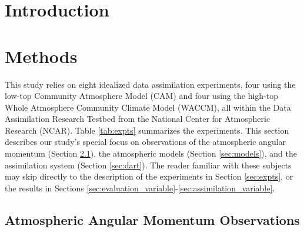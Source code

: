\documentclass[draft,jgrga]{agutex}
\begin{document}
\begin{article}

%
%
\newcommand{\degree}{\ensuremath{^\circ}}
\newcommand{\WACCMNODA}{E1}
\newcommand{\WACCMTROPICS}{E2}
\newcommand{\WACCMGLOBAL}{E3}
\newcommand{\NODA}{E4}
\newcommand{\ERPALL}{E5}
\newcommand{\RST}{E6}
\newcommand{\ERPRST}{E7}


%
%

\section{Introduction}




\section{Methods}
\label{sec:methods}
This study relies on eight idealized data assimilation experiments, four using the low-top Community Atmosphere Model (CAM) and four using the high-top Whole Atmosphere Community Climate Model (WACCM), all within the Data Assimilation Research Testbed \citep[DART]{Anderson2009} from the National Center for Atmospheric Research (NCAR). 
Table \ref{tab:expts} summarizes the experiments. 
This section describes our study's special focus on observations of the atmospheric angular  momentum (Section \ref{sec:obs}), the atmospheric models (Section \ref{sec:models}), and the assimilation system (Section \ref{sec:dart}).  
The reader familiar with these subjects may skip directly to the description of the experiments in Section \ref{sec:expts}, or the results in Sections \ref{sec:evaluation_variable}-\ref{sec:assimilation_variable}.


\subsection{Atmospheric Angular Momentum Observations}
\label{sec:obs}



\end{article}
\end{document}
